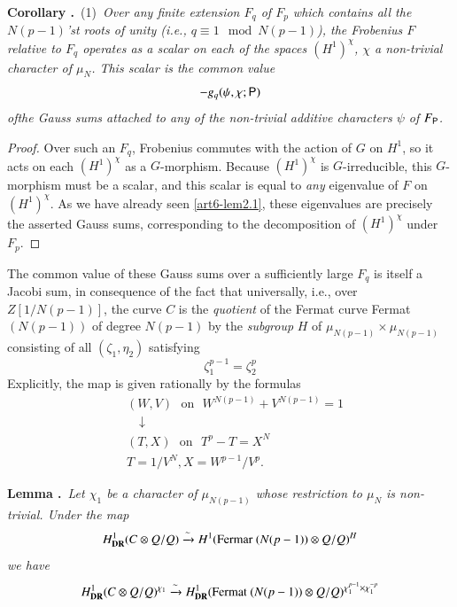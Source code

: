 \noindent
{\bf Corollary .\label{art6-coro7.3}}~(1)~{\em Over any finite extension $F_{q}$ of $F_{p}$ which contains all the $N(p-1)$'st roots of unity (i.e., $q\equiv 1\mod N(p-1)$), the Frobenius $F$ relative to $F_{q}$ operates as a scalar on each of the spaces $(H^{1})^{\chi}$, $\chi$ a non-trivial character of $\mu_{N}$. This scalar is the common value}
$$
-g_{q}(\psi,\chi;\mathsf{P})
$$
{\em of\pageoriginale the Gauss sums attached to any of the non-trivial additive characters $\psi$ of $F_{\mathsf{P}}$.}

\begin{proof}
Over such an $F_{q}$, Frobenius commutes with the action of $G$ on $H^{1}$, so it acts on each $(H^{1})^{\chi}$ as a $G$-morphism. Because $(H^{1})^{\chi}$ is $G$-irreducible, this $G$-morphism must be a scalar, and this scalar is equal to {\em any} eigenvalue of $F$ on $(H^{1})^{\chi}$. As we have already seen \eqref{art6-lem2.1}, these eigenvalues are precisely the asserted Gauss sums, corresponding to the decomposition of $(H^{1})^{\chi}$ under $F_{p}$.
\end{proof}

The common value of these Gauss sums over a sufficiently large $F_{q}$ is itself a Jacobi sum, in consequence of the fact that universally, i.e., over $Z[1/N(p-1)]$, the curve $C$ is the {\em quotient} of the Fermat curve Fermat $(N(p-1))$ of degree $N(p-1)$ by the {\em subgroup} $H$ of $\mu_{N(p-1)}\times \mu_{N(p-1)}$ consisting of all $(\zeta_{1},\eta_{2})$ satisfying
$$
\zeta^{p-1}_{1}=\zeta^{p}_{2}
$$
Explicitly, the map is given rationally by the formulas
\begin{align*}
& (W,V)\text{~ on~ } W^{N(p-1)}+V^{N(p-1)}=1\\
&\quad \downarrow\\
&(T,X)\text{~ on~ }T^{p}-T=X^{N}\\
& T=1/V^{N}, X=W^{p-1}/V^{p}.
\end{align*}

\noindent
{\bf Lemma .\label{art6-lem7.4}}~{\em Let $\chi_{1}$ be a character of $\mu_{N(p-1)}$ whose restriction to $\mu_{N}$ is non-trivial. Under the map}
$$
H^{1}_{\mathbf{DR}}(C\otimes Q/Q)\xrightarrow{\sim} H^{1}(\text{Fermar~}(N(p-1))\otimes Q/Q)^{H}
$$
{\em we have}
$$
H^{1}_{\mathbf{DR}}(C\otimes Q/Q)^{\chi_{1}}\xrightarrow{\sim} H^{1}_{\mathbf{DR}}(\text{Fermat~}(N(p-1))\otimes Q/Q)^{\chi^{p-1}_{1}\times \chi^{-p}_{1}}
$$

